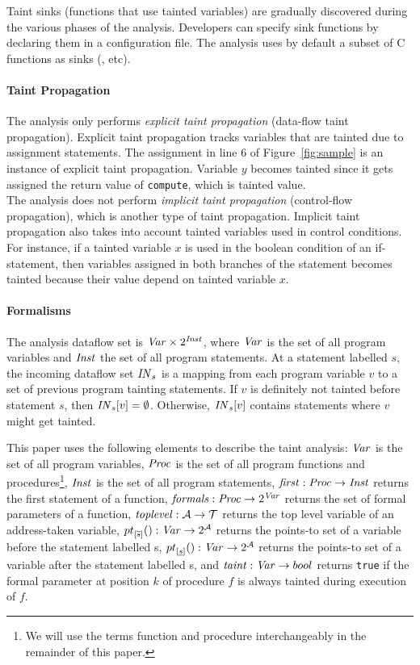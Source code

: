 Taint sinks (functions that use tainted variables) are gradually
discovered during the various phases of the analysis. Developers
can specify sink functions by declaring them in a configuration
file. The analysis uses by default a subset of C functions as
sinks ({\tt  }, etc).

\paragraph{Taint Propagation}
The analysis only performs \textit{explicit taint propagation}
(data-flow taint propagation). Explicit taint propagation tracks variables
that are tainted due to assignment statements. The assignment in line $6$
of Figure~\ref{fig:sample} is an instance of explicit taint propagation.
Variable $y$ becomes tainted since it gets assigned the return value of
\texttt{compute}, which is tainted value.\\
The analysis does not perform \textit{implicit taint propagation}
(control-flow propagation), which is another type of taint propagation.
Implicit taint propagation also takes into account tainted variables
used in control conditions. For instance, if a tainted variable $x$ is
used in the boolean condition of an if-statement, then variables
assigned in both branches of the statement becomes tainted because
their value depend on tainted variable $x$.

\paragraph{Formalisms}
The analysis dataflow set is $\mathit{Var} \times 2^{\mathit{Inst}}$,
where $\mathit{Var}$ is the set of all program variables and
$\mathit{Inst}$ the set of all program statements. 
At a statement labelled $s$, the incoming dataflow set $\mathit{IN}_s$
is a mapping from each program variable $v$ to a set of
previous program tainting statements.
If $v$ is definitely not tainted before statement $s$, then
$\mathit{IN}_s[v] = \emptyset$. Otherwise, $\mathit{IN}_s[v]$
contains statements where $v$ might get tainted.

This paper uses the following elements to describe the
taint analysis:
$\mathit{Var}$ is the set of all program variables,
$\mathit{Proc}$ is the set of all program functions and procedures\footnote{We
will use the terms function and procedure interchangeably in
the remainder of this paper.},
$\mathit{Inst}$ is the set of all program statements,
$\mathit{first}{}: \mathit{Proc} \rightarrow \mathit{Inst}$ returns the first
statement of a function,
$\mathit{formals}{}: \mathit{Proc} \rightarrow 2^{\mathit{Var}}$ returns the
set of formal parameters of a function, 
$\mathit{toplevel}{}: \mathcal{A} \rightarrow \mathcal{T}$ returns the top level
variable of an address-taken variable,
${pt}_{[\overline{s}] }(): \mathit{Var} \rightarrow 2^\mathcal{A}$ returns the
points-to set of a variable before the statement labelled s, 
${pt}_{[\underline{s}]}(): \mathit{Var} \rightarrow 2^\mathcal{A}$ returns the
points-to set of a variable after the statement labelled s,
and $\mathit{taint}: \mathit{Var} \rightarrow bool$ returns \texttt{true}
if the formal parameter at position $k$ of procedure $f$ is always
tainted during execution of $f$.

